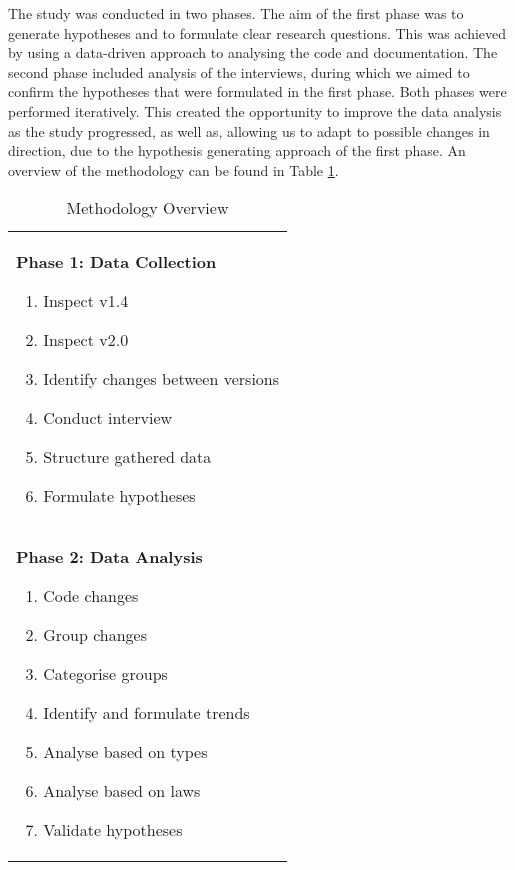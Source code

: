 \documentclass{sig-alternate}
\begin{document}
The study was conducted in two phases. The aim of the first phase was to generate hypotheses and to formulate clear research questions. This was achieved by using a data-driven approach to analysing the code and documentation. The second phase included analysis of the interviews, during which we aimed to confirm the hypotheses that were formulated in the first phase. Both phases were performed iteratively. This created the opportunity to improve the data analysis as the study progressed, as well as, allowing us to adapt to possible changes in direction, due to the hypothesis generating approach of the first phase. An overview of the methodology can be found in Table \ref{table:meth_steps}.

\begin{table}
       \centering
       \begin{tabular}[ht]{p{3in}}
              \toprule

              \textbf{Phase 1: Data Collection}
              
              \begin{enumerate}
				\item Inspect v1.4
				\item Inspect v2.0
				\item Identify changes between versions
				\item Conduct interview
				\item Structure gathered data
				\item Formulate hypotheses
              \end{enumerate} \\ 


              
              \textbf{Phase 2: Data Analysis} 
              
              \begin{enumerate}
              \item Code changes
              \item Group changes
              \item Categorise groups 
              \item Identify and formulate trends
              \item Analyse based on types \cite{chapin2001types}
              \item Analyse based on laws \cite{lehman90sview}
              \item Validate hypotheses
              \end{enumerate} \\
              
              \bottomrule
       \end{tabular}
       \caption{Methodology Overview}
       \label{table:meth_steps}
\end{table} 
\end{document}
